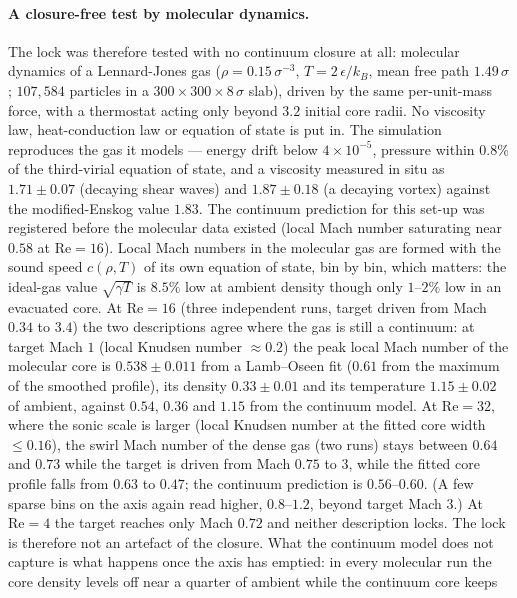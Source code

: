 \documentclass[11pt,a4paper]{article}
\begin{document}
\paragraph{A closure-free test by molecular dynamics.} The lock was therefore tested with no continuum
closure at all: molecular dynamics of a Lennard-Jones gas ($\rho=0.15\,\sigma^{-3}$, $T=2\,\epsilon/k_B$,
mean free path $1.49\,\sigma$; $107{,}584$ particles in a $300\times300\times8\,\sigma$ slab), driven by the
same per-unit-mass force, with a thermostat acting only beyond $3.2$ initial core radii. No viscosity law,
heat-conduction law or equation of state is put in. The simulation reproduces the gas it models --- energy
drift below $4\times10^{-5}$, pressure within $0.8\%$ of the third-virial equation of state, and a viscosity
measured in situ as $1.71\pm0.07$ (decaying shear waves) and $1.87\pm0.18$ (a decaying vortex) against the
modified-Enskog value $1.83$. The continuum prediction for this set-up was registered before the molecular
data existed (local Mach number saturating near $0.58$ at $\mathrm{Re}=16$). Local Mach numbers in the
molecular gas are formed with the sound speed $c(\rho,T)$ of its own equation of state, bin by bin, which
matters: the ideal-gas value $\sqrt{\gamma T}$ is $8.5\%$ low at ambient density though only $1$--$2\%$ low
in an evacuated core. At $\mathrm{Re}=16$ (three independent runs, target driven from Mach $0.34$ to $3.4$) the
two descriptions agree where the gas is still a continuum: at target Mach $1$ (local Knudsen number
$\approx0.2$) the peak local Mach number of the molecular core is $0.538\pm0.011$ from a Lamb--Oseen fit
($0.61$ from the maximum of the smoothed profile), its density $0.33\pm0.01$ and its temperature $1.15\pm0.02$
of ambient, against $0.54$, $0.36$ and $1.15$ from the continuum model. At $\mathrm{Re}=32$, where the sonic
scale is larger (local Knudsen number at the fitted core width $\le0.16$), the swirl Mach number of the
dense gas (two runs) stays between $0.64$ and $0.73$ while the target is driven from Mach $0.75$ to $3$, while the
fitted core profile falls from $0.63$ to $0.47$; the continuum prediction is $0.56$--$0.60$. (A few sparse bins on
the axis again read higher, $0.8$--$1.2$, beyond target Mach $3$.) At $\mathrm{Re}=4$ the
target reaches only Mach $0.72$ and neither description locks. The lock is therefore not an artefact of the
closure. What the continuum model does not capture is what happens once the axis has emptied: in every
molecular run the core density levels off near a quarter of ambient while the continuum core keeps
\end{document}
